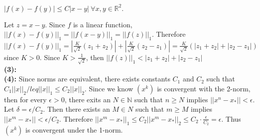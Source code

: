 \documentclass{article}
\newcommand{\N}{\mathbb{N}}
\newcommand{\R}{\mathbb{R}}
\begin{document}
\centerline{$|f(x) - f(y)| \leq C|x - y| \ \forall x, y \in \R^2.$}
\vspace{1pc}

Let $z = x - y.$ Since $f$ is a linear function, $||f(x) - f(y)||_1 = ||f(x - y)||_1 = ||f(z)||_1.$ Therefore $||f(x) - f(y)||_1 = |\frac{K}{\sqrt{2}}(z_1 + z_2)| + |\frac{K}{\sqrt{2}}(z_2 - z_1)| = \frac{K}{\sqrt{2}}\left(|z_1 + z_2| + |z_2 - z_1|\right)$ since $K > 0$. Since $K > \frac{1}{\sqrt{2}}$, then $||f(z)||_1 < |z_1 + z_2| + |z_2 - z_1|$ \\

\noindent \textbf{(3):} \\

\noindent \textbf{(4):} Since norms are equivalent, there exists constants $C_1$ and $C_2$ such that $C_1||x||_2 /leq ||x||_1 \leq C_2||x||_2$. Since we know $(x^k)$ is convergent with the 2-norm, then for every $\epsilon > 0$, there exits an $N \in \N$ such that $n \geq N$ implies $||x^n - x_*|| < \epsilon$. Let $\delta = \epsilon / C_2$. Then there exists an $M \in N$ such that $m \geq M$ implies $||x^m - x_*|| < \epsilon / C_2$. Therefore $||x^m - x_*||_1 \leq C_2||x^m - x_*||_2 \leq C_2 \cdot \frac{\epsilon}{C_2} = \epsilon$. Thus $(x^k)$ is convergent under the 1-norm.
\end{document}
